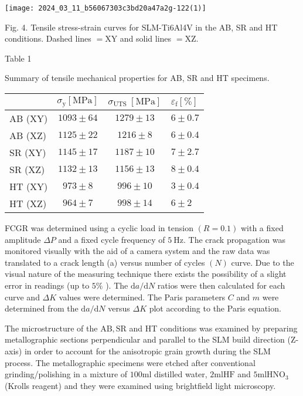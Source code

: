 \documentclass[10pt]{article}
\begin{document}
\begin{center}
\texttt{[image: 2024\_03\_11\_b56067303c3bd20a47a2g-122(1)]}
\end{center}

Fig. 4. Tensile stress-strain curves for SLM-Ti6Al4V in the AB, SR and HT conditions. Dashed lines $=\mathrm{XY}$ and solid lines $=\mathrm{XZ}$.

Table 1

Summary of tensile mechanical properties for AB, SR and HT specimens.

\begin{center}
\begin{tabular}{lccl}
\hline
 & $\sigma_{\mathrm{y}}[\mathrm{MPa}]$ & $\sigma_{\text {UTS }}[\mathrm{MPa}]$ & $\varepsilon_{\mathrm{f}}[\%]$ \\
\hline
AB (XY) & $1093 \pm 64$ & $1279 \pm 13$ & $6 \pm 0.7$ \\
AB (XZ) & $1125 \pm 22$ & $1216 \pm 8$ & $6 \pm 0.4$ \\
SR (XY) & $1145 \pm 17$ & $1187 \pm 10$ & $7 \pm 2.7$ \\
SR (XZ) & $1132 \pm 13$ & $1156 \pm 13$ & $8 \pm 0.4$ \\
HT (XY) & $973 \pm 8$ & $996 \pm 10$ & $3 \pm 0.4$ \\
HT (XZ) & $964 \pm 7$ & $998 \pm 14$ & $6 \pm 2$ \\
\hline
\end{tabular}
\end{center}

FCGR was determined using a cyclic load in tension $(R=0.1)$ with a fixed amplitude $\Delta P$ and a fixed cycle frequency of $5 \mathrm{~Hz}$. The crack propagation was monitored visually with the aid of a camera system and the raw data was translated to a crack length (a) versus number of cycles $(N)$ curve. Due to the visual nature of the measuring technique there exists the possibility of a slight error in readings (up to $5 \%$ ). The $\mathrm{d} a / \mathrm{d} N$ ratios were then calculated for each curve and $\Delta K$ values were determined. The Paris parameters $C$ and $m$ were determined from the $\mathrm{d} a / \mathrm{d} N$ versus $\Delta K$ plot according to the Paris equation.

The microstructure of the $\mathrm{AB}, \mathrm{SR}$ and HT conditions was examined by preparing metallographic sections perpendicular and parallel to the SLM build direction (Z-axis) in order to account for the anisotropic grain growth during the SLM process. The metallographic specimens were etched after conventional grinding/polishing in a mixture of $100 \mathrm{ml}$ distilled water, $2 \mathrm{ml} \mathrm{HF}$ and $5 \mathrm{ml} \mathrm{HNO}_{3}$ (Krolls reagent) and they were examined using brightfield light microscopy.
\end{document}
